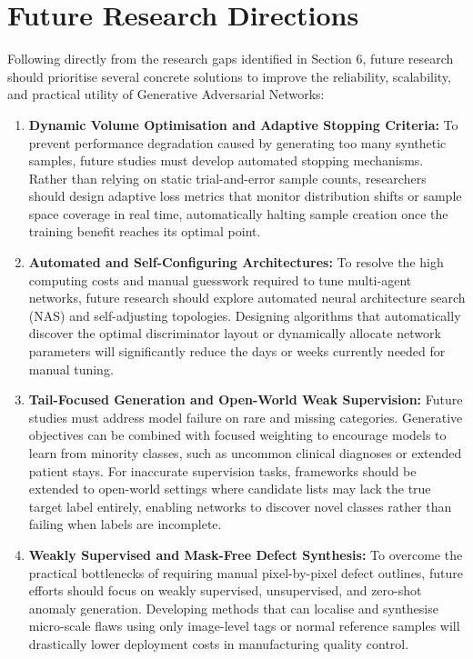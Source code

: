 \documentclass[12pt,a4paper]{article}
\begin{document}
\section{Future Research Directions}
\label{sec:future-research-directions}

Following directly from the research gaps identified in Section 6, future research should prioritise several concrete solutions to improve the reliability, scalability, and practical utility of Generative Adversarial Networks:

\begin{enumerate}
    \item \textbf{Dynamic Volume Optimisation and Adaptive Stopping Criteria:}
    To prevent performance degradation caused by generating too many synthetic samples, future studies must develop automated stopping mechanisms. Rather than relying on static trial-and-error sample counts, researchers should design adaptive loss metrics that monitor distribution shifts or sample space coverage in real time, automatically halting sample creation once the training benefit reaches its optimal point.

    \item \textbf{Automated and Self-Configuring Architectures:}
    To resolve the high computing costs and manual guesswork required to tune multi-agent networks, future research should explore automated neural architecture search (NAS) and self-adjusting topologies. Designing algorithms that automatically discover the optimal discriminator layout or dynamically allocate network parameters will significantly reduce the days or weeks currently needed for manual tuning.

    \item \textbf{Tail-Focused Generation and Open-World Weak Supervision:}
    Future studies must address model failure on rare and missing categories. Generative objectives can be combined with focused weighting to encourage models to learn from minority classes, such as uncommon clinical diagnoses or extended patient stays. For inaccurate supervision tasks, frameworks should be extended to open-world settings where candidate lists may lack the true target label entirely, enabling networks to discover novel classes rather than failing when labels are incomplete.

    \item \textbf{Weakly Supervised and Mask-Free Defect Synthesis:}
    To overcome the practical bottlenecks of requiring manual pixel-by-pixel defect outlines, future efforts should focus on weakly supervised, unsupervised, and zero-shot anomaly generation. Developing methods that can localise and synthesise micro-scale flaws using only image-level tags or normal reference samples will drastically lower deployment costs in manufacturing quality control.
 

\end{enumerate}
\end{document}
